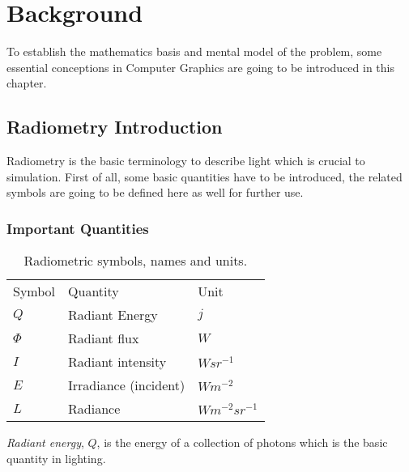 \chapter{Background}

To establish the mathematics basis and mental model of the problem, some essential conceptions in Computer Graphics are going to be introduced in this chapter.  


\section{Radiometry Introduction}
Radiometry is the basic terminology to describe light which is crucial to simulation. First of all, some basic quantities have to be introduced, the related symbols are going to be defined here as well for further use.

\subsection{Important Quantities} 

\begin{table}[!ht]
\begin{center}
	\begin{tabular}{ | l | l | l |}     	
	\hline 

	Symbol & Quantity & Unit \\

	\(Q\) 			& 		Radiant Energy 				& 		\(j\) \\ 
	\(\Phi\) 			& 		Radiant flux 					& 		\(W\) \\ 
	\(I\) 			& 		Radiant intensity 				& 		\(W sr^{-1}\) \\
	\(E\)			&		Irradiance (incident) 			&		\(W m^{-2}\) \\  
	\(L\)			&		Radiance						&		\(W m^{-2} sr^{-1}\) \\ 
	
	\hline

	\end{tabular}
\end{center} 
\caption{Radiometric symbols, names and units.}
\label{tab:radiometry_quantities}
\end{table}

\emph{Radiant energy}, \(Q\), is the energy of a collection of photons which is the basic quantity in lighting. 

